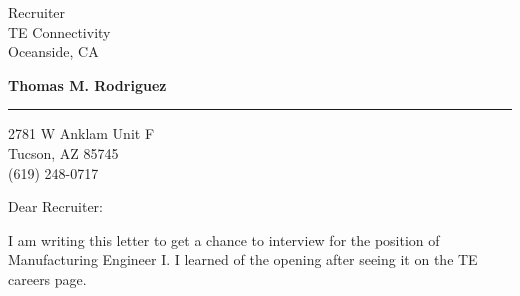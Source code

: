 \documentclass{letter} %
\begin{document}
\signature{Thomas M. Rodriguez}           %
\longindentation=0pt                       %
\let\raggedleft\raggedright                %
 
 
\begin{letter}{Recruiter \\
TE Connectivity \\
Oceanside, CA}

\begin{center}
{\large\bf Thomas M. Rodriguez}
\end{center}
\medskip\hrule height 1pt
\begin{center}
{2781 W Anklam Unit F \\ Tucson, AZ 85745 \\ (619) 248-0717}
\end{center} \vfill %
 
 
\opening{Dear Recruiter:} 
 

\noindent I am writing this letter to get a chance to interview for the position of Manufacturing Engineer I.  I learned of the opening after seeing it on the TE careers page.
 


\end{letter}
\end{document}
